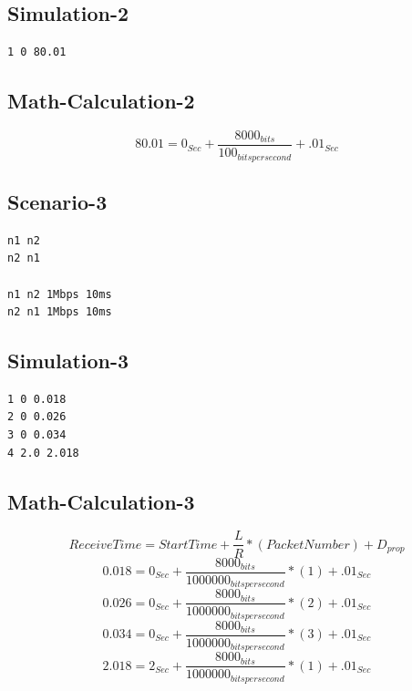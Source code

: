\documentclass{article}
\begin{document}
\subsection{Simulation-2}
\begin{verbatim}
1 0 80.01
\end{verbatim}
\subsection{Math-Calculation-2}
\begin{equation}
    80.01 = 0_{Sec} + \frac {8000_{bits}}{100_{bits per second}} + .01_{Sec}
\end{equation}
\subsection{Scenario-3}
\begin{verbatim}
n1 n2
n2 n1

n1 n2 1Mbps 10ms
n2 n1 1Mbps 10ms
\end{verbatim}
\subsection{Simulation-3}
\begin{verbatim}
1 0 0.018
2 0 0.026
3 0 0.034
4 2.0 2.018
\end{verbatim}
\subsection{Math-Calculation-3}
\begin{equation}
    Receive Time = StartTime + \frac {L}{R} *(PacketNumber) + D_{prop} 
\end{equation} 
\begin{equation}
    0.018 = 0_{Sec} + \frac {8000_{bits}}{1000000_{bits per second}} * (1) + .01_{Sec}
\end{equation}
\begin{equation}
    0.026 = 0_{Sec} + \frac {8000_{bits}}{1000000_{bits per second}} * (2) + .01_{Sec}
\end{equation}
\begin{equation}
    0.034 = 0_{Sec} + \frac {8000_{bits}}{1000000_{bits per second}} * (3) + .01_{Sec}
\end{equation}
\begin{equation}
    2.018 = 2_{Sec} + \frac {8000_{bits}}{1000000_{bits per second}} * (1) + .01_{Sec}
\end{equation} 
\end{document}
